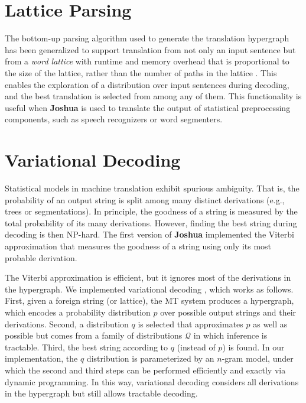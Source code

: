 \documentclass[11pt]{article}
\newcommand{\joshua}{\textbf{Joshua}\xspace}
\begin{document}

\section{Lattice Parsing}

The bottom-up parsing algorithm used to generate the translation hypergraph has been generalized to support translation from not only an input sentence but from a \emph{word lattice} with runtime and memory overhead that is proportional to the size of the lattice, rather than the number of paths in the lattice \cite{dyer-muresan-resnik:2008:ACLMain}.  This enables the exploration of a distribution over input sentences during decoding, and the best translation is selected from among any of them.  This functionality is useful when \joshua is used to translate the output of statistical preprocessing components, such as speech recognizers or word segmenters.

\section{Variational Decoding}

Statistical models in machine translation exhibit spurious ambiguity.
That is, the probability of an output string is split
among many distinct derivations (e.g., trees or
segmentations). In principle, the goodness of a
string is measured by the total probability of its
many derivations. However, finding the best string
during decoding is then NP-hard.
The first version of \joshua implemented the
Viterbi approximation that measures the goodness 
of a string using only its most probable derivation.

The Viterbi approximation is efficient, but it ignores most of the derivations in the hypergraph.
We implemented variational decoding \cite{variational-decoding-acl09}, which works as follows.
First, given a foreign string (or lattice), the MT system produces a hypergraph, 
which encodes a probability distribution $p$ over 
possible output strings and their derivations.
Second, a distribution $q$ is selected that approximates $p$ as well as possible but comes from a family of distributions $\mathcal{Q}$ in which inference is tractable.  Third, the best string according to $q$ (instead of $p$) is found.
In our implementation, the $q$ distribution is parameterized by an $n$-gram model, under which 
the second and third steps can be performed efficiently and exactly via dynamic programming.
In this way, variational decoding considers all derivations in the hypergraph but still
allows tractable decoding. 
\end{document}
